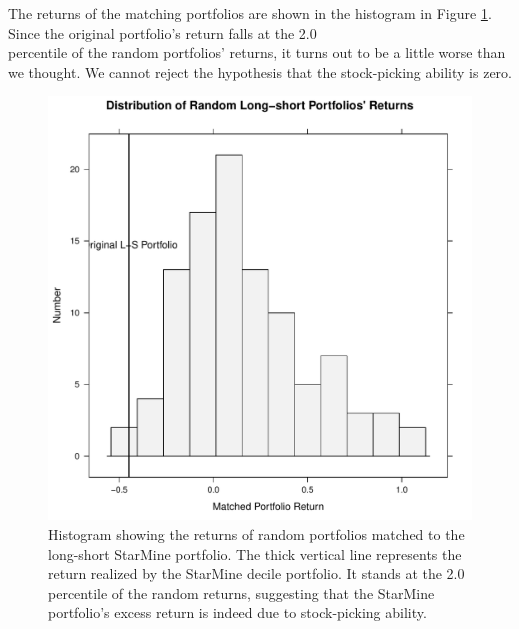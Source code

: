 \documentclass{article}\usepackage{graphicx, color}
\makeatletter
\def\maxwidth{ %
  \ifdim\Gin@nat@width>\linewidth
    \linewidth
  \else
    \Gin@nat@width
  \fi
}
\newenvironment{knitrout}{}{} %
\makeatother
\begin{document}
The returns of the matching portfolios are shown in the histogram in
Figure \ref{FigureLSRandomPortfolio}. Since the original portfolio's
return falls at the 2.0\\%
percentile of the random portfolios' returns, it turns out to be a
little worse than we thought. We cannot reject the hypothesis that the
stock-picking ability is zero.

\begin{figure}
\begin{center}
\begin{knitrout}
\color{fgcolor}
\includegraphics[width=\maxwidth]{figure/unnamed-chunk-20} 

\end{knitrout}

\caption{Histogram showing the returns of random portfolios matched to
  the long-short StarMine portfolio. The thick vertical line
  represents the return realized by the StarMine decile portfolio. It
  stands at the 2.0\\%
  percentile of the random returns, suggesting that the StarMine
  portfolio's excess return is indeed due to stock-picking ability.}
\label{FigureLSRandomPortfolio}
\end{center}
\end{figure}
\end{document}
